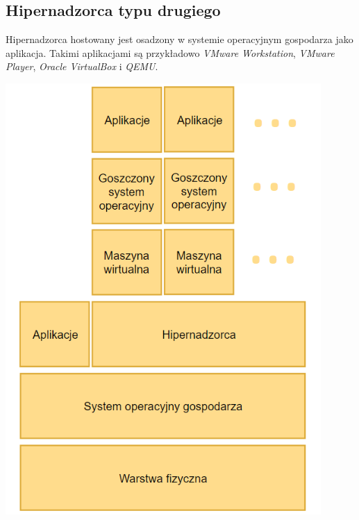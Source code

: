 \documentclass[polish, a4paper, 12pt, oneside]{book}
\begin{document}
	\subsection {Hipernadzorca typu drugiego} 
	Hipernadzorca hostowany jest osadzony w systemie operacyjnym gospodarza jako aplikacja. Takimi aplikacjami są przykładowo \textit{VMware Workstation}\cite{vmwareworkstation}, \textit{VMware Player}\cite{vmwareplayer}, \textit{Oracle VirtualBox}\cite{virtualbox} i \textit{QEMU}\cite{qemu}.
	\begin{center}
		\includegraphics[width=120mm]{schemat_hiper2.png}
	\end{center}
	
\end{document}
